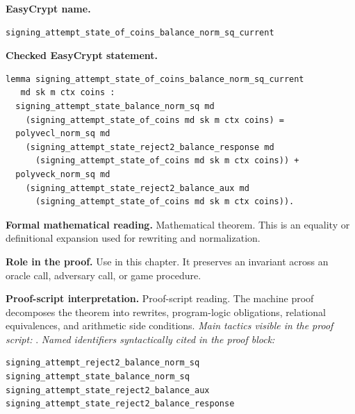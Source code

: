 \begin{formaltheorem}
\noindent\textbf{EasyCrypt name.}
\begin{lstlisting}[language=EasyCrypt,basicstyle=\ttfamily\scriptsize]
signing_attempt_state_of_coins_balance_norm_sq_current
\end{lstlisting}
\noindent\textbf{Checked EasyCrypt statement.}
\begin{lstlisting}[language=EasyCrypt,basicstyle=\ttfamily\scriptsize]
lemma signing_attempt_state_of_coins_balance_norm_sq_current
   md sk m ctx coins :
  signing_attempt_state_balance_norm_sq md
    (signing_attempt_state_of_coins md sk m ctx coins) =
  polyvecl_norm_sq md
    (signing_attempt_state_reject2_balance_response md
      (signing_attempt_state_of_coins md sk m ctx coins)) +
  polyveck_norm_sq md
    (signing_attempt_state_reject2_balance_aux md
      (signing_attempt_state_of_coins md sk m ctx coins)).
\end{lstlisting}
\noindent\textbf{Formal mathematical reading.}
Mathematical theorem. This is an equality or definitional expansion used for rewriting and normalization.

\noindent\textbf{Role in the proof.}
Use in this chapter. It preserves an invariant across an oracle call, adversary call, or game procedure.

\noindent\textbf{Proof-script interpretation.}
Proof-script reading. The machine proof decomposes the theorem into rewrites, program-logic obligations, relational equivalences, and arithmetic side conditions.
\emph{Main tactics visible in the proof script:} .
\emph{Named identifiers syntactically cited in the proof block:}
\begin{lstlisting}[language=EasyCrypt,basicstyle=\ttfamily\scriptsize]
signing_attempt_reject2_balance_norm_sq
signing_attempt_state_balance_norm_sq
signing_attempt_state_reject2_balance_aux
signing_attempt_state_reject2_balance_response
\end{lstlisting}

\end{formaltheorem}

